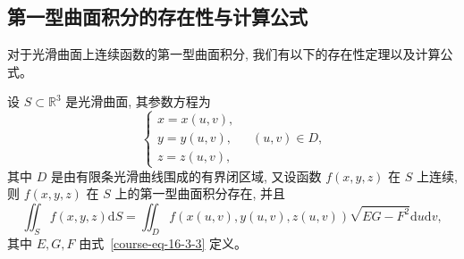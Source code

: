 \documentclass[12pt,fontset=fandol]{ctexart}
\begin{document}
\subsection{第一型曲面积分的存在性与计算公式}

对于光滑曲面上连续函数的第一型曲面积分, 我们有以下的存在性定理以及计算公式。

\begin{theorem}\label{course-theorem-16-3-2}\quad 设 $S\subset\mathbb R^3$ 是光滑曲面, 其参数方程为
\[
  \begin{cases}
    x=x(u,v),\\
    y=y(u,v),\\
    z=z(u,v),
  \end{cases}
  \quad (u,v)\in D,
\]
其中 $D$ 是由有限条光滑曲线围成的有界闭区域, 又设函数 $f(x,y,z)$ 在 $S$ 上连续, 则 $f(x,y,z)$ 在 $S$ 上的第一型曲面积分存在, 并且
\begin{equation}
  \iint_S f(x,y,z)\mathrm dS
  =\iint_D f(x(u,v),y(u,v),z(u,v))\sqrt{EG-F^2}\mathrm du\mathrm dv,
  \label{course-eq-16-3-4}
\end{equation}
其中 $E,G,F$ 由式~\eqref{course-eq-16-3-3}  定义。

\end{theorem}
\end{document}
